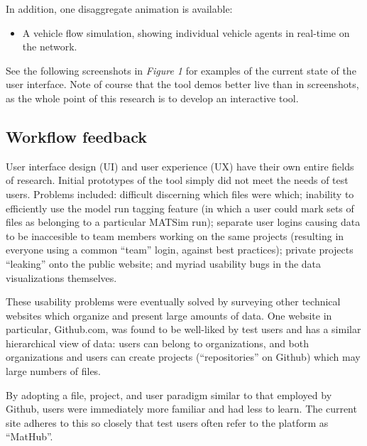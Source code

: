 In addition, one disaggregate animation is available:

\begin{itemize}
\tightlist
\item
  A vehicle flow simulation, showing individual vehicle agents in
  real-time on the network.
\end{itemize}

See the following screenshots in \emph{Figure 1} for examples of the current state of the user interface. Note of course that the tool demos better live than in screenshots, as the whole point of this research is to develop an interactive tool.


\hypertarget{workflow-feedback}{%
\subsection{Workflow feedback}\label{workflow-feedback}}

User interface design (UI) and user experience (UX) have their own entire fields of research. Initial prototypes of the tool simply did not meet the needs of test users. Problems included: difficult discerning which files were which; inability to efficiently use the model run tagging feature (in which a user could mark sets of files as belonging to a particular MATSim run); separate user logins causing data to be inaccesible to team members working on the same projects (resulting in everyone using a common ``team'' login, against best practices); private projects ``leaking'' onto the public website; and myriad usability bugs in the data visualizations themselves.

These usability problems were eventually solved by surveying other technical websites which organize and present large amounts of data. One website in particular, Github.com, was found to be well-liked by test users and has a similar hierarchical view of data: users can belong to organizations, and both organizations and users can create projects (``repositories'' on Github) which may large numbers of files.

By adopting a file, project, and user paradigm similar to that employed by Github, users were immediately more familiar and had less to learn. The current site adheres to this so closely that test users often refer to the platform as ``MatHub''.

